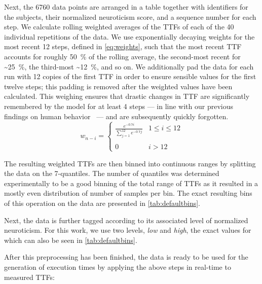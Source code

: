 Next, the \num{6760} data points are arranged in a table together with identifiers for the subjects, their normalized neuroticism score, and a sequence number for each step.
We calculate rolling weighted averages of the \glspl{TTF} of each of the \num{40} individual repetitions of the data.
We use exponentially decaying weights for the most recent \num{12} steps, defined in \cref{eq:weights}, such that the most recent \gls{TTF} accounts for roughly \SI{50}{\percent} of the rolling average, the second-most recent for \textasciitilde\SI{25}{\percent}, the third-most \textasciitilde\SI{12}{\percent}, and so on.
We additionally pad the data for each run with \num{12} copies of the first \gls{TTF} in order to ensure sensible values for the first twelve steps; this padding is removed after the weighted values have been calculated.
This weighing ensures that drastic changes in \gls{TTF} are significantly remembered by the model for at least \num{4} steps --- in line with our previous findings on human behavior~\cite{olguinmunoz2021impact} --- and are subsequently quickly forgotten.
\begin{equation}\label{eq:weights}
    w_{n - i} = 
    \left\{ \begin{array}{ll}
        \frac{e^{-0.7 i}}{\sum\limits^{12}_{j=1} e^{-0.7 j}} & 1 \leq i \leq 12 \\
        & \\
        0 & i > 12
    \end{array} \right.
\end{equation}

The resulting weighted \glspl{TTF} are then binned into continuous ranges by splitting the data on the \num{7}-quantiles.
The number of quantiles was determined experimentally to be a good binning of the total range of \glspl{TTF} as it resulted in a mostly even distribution of number of samples per bin.
The exact resulting bins of this operation on the data are presented in \cref{tab:defaultbins}.

Next, the data is further tagged according to its associated level of normalized neuroticism.
For this work, we use two levels, \emph{low} and \emph{high}, the exact values for which can also be seen in \cref{tab:defaultbins}.

After this preprocessing has been finished, the data is ready to be used for the generation of execution times by applying the above steps in real-time to measured \glspl{TTF}:

